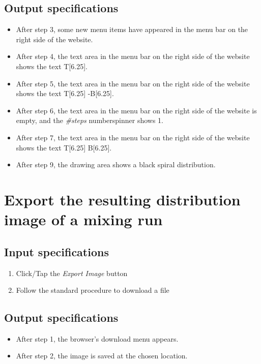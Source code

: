 \subsection*{Output specifications}
\begin{itemize}
\item After step 3, some new menu items have appeared in the menu bar on the right side of the website.
\item After step 4, the text area in the menu bar on the right side of the website shows the text T[6.25].
\item After step 5, the text area in the menu bar on the right side of the website shows the text T[6.25] -B[6.25].
\item After step 6, the text area in the menu bar on the right side of the website is empty, and the \emph{\#steps} numberspinner shows 1.
\item After step 7, the text area in the menu bar on the right side of the website shows the text T[6.25] B[6.25].
\item After step 9, the drawing area shows a black spiral distribution.
\end{itemize}

\section{Export the resulting distribution image of a mixing run}

\subsection*{Input specifications}
\begin{enumerate}
\item Click/Tap the \emph{Export Image} button
\item Follow the standard procedure to download a file
\end{enumerate}

\subsection*{Output specifications}
\begin{itemize}
\item After step 1, the browser's download menu appears.
\item After step 2, the image is saved at the chosen location.
\end{itemize}

